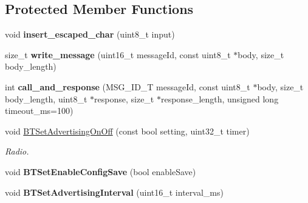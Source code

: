 \subsection*{Protected Member Functions}
\begin{DoxyCompactItemize}
\item 
\hypertarget{class_bean_serial_transport_a75ee13dac71efd336dc903af6f48e364}{}void {\bfseries insert\+\_\+escaped\+\_\+char} (uint8\+\_\+t input)\label{class_bean_serial_transport_a75ee13dac71efd336dc903af6f48e364}

\item 
\hypertarget{class_bean_serial_transport_af41c8631122a5a53b33ee273bd048f31}{}size\+\_\+t {\bfseries write\+\_\+message} (uint16\+\_\+t message\+Id, const uint8\+\_\+t $\ast$body, size\+\_\+t body\+\_\+length)\label{class_bean_serial_transport_af41c8631122a5a53b33ee273bd048f31}

\item 
\hypertarget{class_bean_serial_transport_ab24bcc5239469cb346504e930c2ca58a}{}int {\bfseries call\+\_\+and\+\_\+response} (M\+S\+G\+\_\+\+I\+D\+\_\+\+T message\+Id, const uint8\+\_\+t $\ast$body, size\+\_\+t body\+\_\+length, uint8\+\_\+t $\ast$response, size\+\_\+t $\ast$response\+\_\+length, unsigned long timeout\+\_\+ms=100)\label{class_bean_serial_transport_ab24bcc5239469cb346504e930c2ca58a}

\item 
\hypertarget{class_bean_serial_transport_a88da400711252bd0da4f1e954d1281cb}{}void \hyperlink{class_bean_serial_transport_a88da400711252bd0da4f1e954d1281cb}{B\+T\+Set\+Advertising\+On\+Off} (const bool setting, uint32\+\_\+t timer)\label{class_bean_serial_transport_a88da400711252bd0da4f1e954d1281cb}

\begin{DoxyCompactList}\small\item\em Radio. \end{DoxyCompactList}\item 
\hypertarget{class_bean_serial_transport_abcfd679127df7a96c4e559edfce44ab4}{}void {\bfseries B\+T\+Set\+Enable\+Config\+Save} (bool enable\+Save)\label{class_bean_serial_transport_abcfd679127df7a96c4e559edfce44ab4}

\item 
\hypertarget{class_bean_serial_transport_a04a7ce0c9d01c78c457b07079f753ae4}{}void {\bfseries B\+T\+Set\+Advertising\+Interval} (uint16\+\_\+t interval\+\_\+ms)\label{class_bean_serial_transport_a04a7ce0c9d01c78c457b07079f753ae4}


\end{DoxyCompactItemize}
